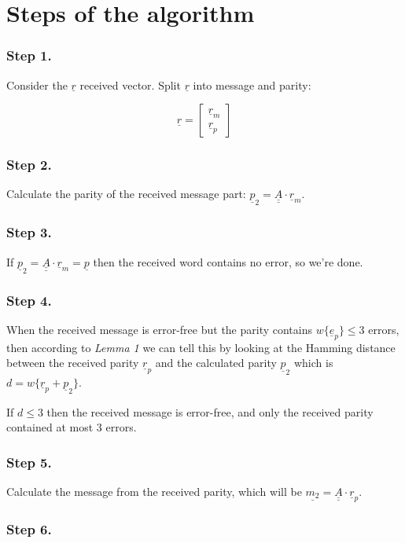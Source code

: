 \documentclass[11pt,a4paper,oneside]{report}             %
\def\doubleunderline#1{\underline{\underline{#1}}}
\def\dul#1{\doubleunderline{#1}}
\def\ul#1{\underline{#1}}
\newcommand{\vect}[2]{\begin{bmatrix} #1 \\ #2 \end{bmatrix}}
\begin{document}
\section{Steps of the algorithm}

\subsubsection{Step 1.}

Consider the $\ul{r}$ received vector.
Split $\ul{r}$ into message and parity:

\[
    \ul{r} = \vect{\ul{r}_m}{\ul{r}_p}
\]

\subsubsection{Step 2.}

Calculate the parity of the received message part: $\ul{p}_2 = \dul{A} \cdot \ul{r}_m$.

\subsubsection{Step 3.}

If $\ul{p}_2 = \dul{A} \cdot \ul{r}_m = \ul{p}$ then the received word contains no error, so we're done.

\subsubsection{Step 4.}

When the received message is error-free but the parity contains $w\{\ul{e}_p\} \leq 3$ errors, then according to
\emph{Lemma 1} we can tell this by looking at the Hamming distance between the received parity $\ul{r}_p$ and
the calculated parity $\ul{p}_2$ which is $d = w\{\ul{r}_p + \ul{p}_2\}$.

If $d \leq 3$ then the received message is error-free, and only the received parity contained at most 3 errors.

\subsubsection{Step 5.}

Calculate the message from the received parity, which will be $\ul{m_2} = \dul{A} \cdot \ul{r}_p$.

\subsubsection{Step 6.}
\end{document}

